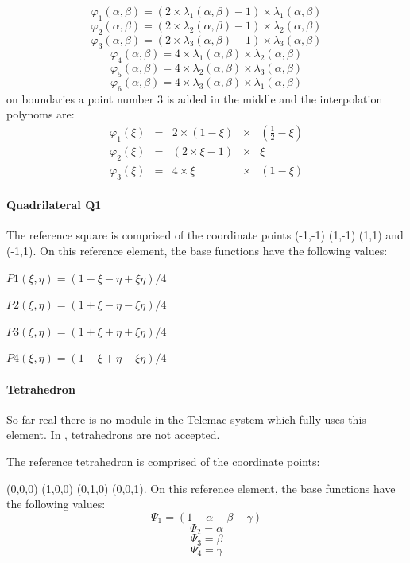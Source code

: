 \[\varphi _{1} (\alpha , \beta )=(2\times \lambda _{1} (\alpha , \beta
)-1)\times \lambda _{1} (\alpha , \beta )\]
\[\varphi _{2} (\alpha , \beta )=(2\times \lambda _{2} (\alpha , \beta
)-1)\times \lambda _{2} (\alpha , \beta )\]
\[\varphi _{3} (\alpha , \beta )=(2\times \lambda _{3} (\alpha , \beta
)-1)\times \lambda _{3} (\alpha , \beta )\]
\[\varphi _{4} (\alpha , \beta )=4\times \lambda _{1} (\alpha , \beta
)\times \lambda _{2} (\alpha , \beta )\]
\[\varphi _{5} (\alpha , \beta )=4\times \lambda _{2} (\alpha , \beta
)\times \lambda _{3} (\alpha , \beta )\]
\[\varphi _{6} (\alpha , \beta )=4\times \lambda _{3} (\alpha , \beta
)\times \lambda _{1} (\alpha , \beta )\]
 on boundaries a point number 3 is added in the middle and
the interpolation polynoms are:
\[\begin{array}{lllll}
  {\varphi _{1} (\xi )} & {=} & {2\times (1-\xi )} & {\times } & {({\textstyle\frac{1}{2}} -\xi )} \\
  {\varphi _{2} (\xi )} & {=} & {(2\times \xi -1)} & {\times } & {\xi } \\
  {\varphi _{3} (\xi )} & {=} & {4\times \xi } & {\times } & {(1-\xi )}
\end{array}\]

\paragraph{Quadrilateral Q1}

The reference square is comprised of the coordinate points (-1,-1)  (1,-1)  (1,1) and (-1,1). On this reference element, the base functions have the following values:

$P1(\xi,\eta) = ( 1 - \xi- \eta + \xi\eta)/4$

$P2(\xi,\eta) = ( 1 + \xi- \eta - \xi\eta)/4$

$P3(\xi,\eta) = ( 1 + \xi+ \eta + \xi\eta)/4$

$P4(\xi,\eta) = ( 1 - \xi+ \eta - \xi\eta)/4$

\paragraph{Tetrahedron}

So far real there is no module in the Telemac system which fully uses this
element. In , tetrahedrons are not accepted.

The reference tetrahedron is comprised of the coordinate points:

(0,0,0)  (1,0,0)  (0,1,0)  (0,0,1). On this reference element, the base
functions have the following values:
\[\Psi _{1} =(1-\alpha -\beta -\gamma )\]
\[\Psi _{2} =\alpha \]
\[\Psi _{3} =\beta \]
\[\Psi _{4} =\gamma \]

